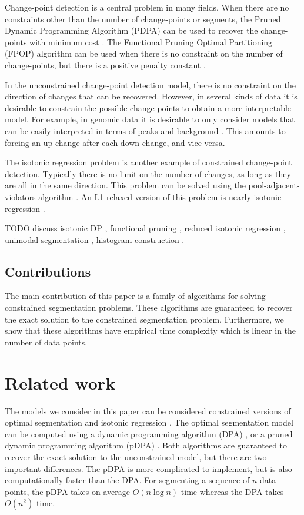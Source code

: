 \documentclass{article}
\begin{document}
Change-point detection is a central problem in many fields. When there
are no constraints other than the number of change-points or segments,
the Pruned Dynamic Programming Algorithm (PDPA) can be used to recover
the change-points with minimum cost \citep{pruned-dp}. The Functional
Pruning Optimal Partitioning (FPOP) algorithm can be used when there
is no constraint on the number of change-points, but there is a
positive penalty constant \citep{FPOP}. 

In the unconstrained change-point detection model, there is no
constraint on the direction of changes that can be recovered. However,
in several kinds of data it is desirable to constrain the possible
change-points to obtain a more interpretable model. For example, in
genomic data it is desirable to only consider models that can be
easily interpreted in terms of peaks and background
\citep{HOCKING-PeakSeg}. This amounts to forcing an up change after each down
change, and vice versa.

The isotonic regression problem is another example of constrained
change-point detection. Typically there is no limit on the number of
changes, as long as they are all in the same direction. This problem
can be solved using the pool-adjacent-violators algorithm
\citep{mair2009isotone}. An L1 relaxed version of this problem is
nearly-isotonic regression \citep{tibshirani2011nearly}.

TODO discuss isotonic DP \citep{isotonic-dp}, functional pruning
\citep{phd-johnson}, reduced isotonic regression
\citep{hardwick2014optimal}, unimodal segmentation
\citep{haiminen2008algorithms}, histogram construction
\citep{halim2009fast}.

\subsection{Contributions}

The main contribution of this paper is a family of algorithms for
solving constrained segmentation problems. These algorithms are
guaranteed to recover the exact solution to the constrained
segmentation problem. Furthermore, we show that these algorithms have
empirical time complexity which is linear in the number of data
points.

\section{Related work}
\label{sec:related}

The models we consider in this paper can be considered constrained
versions of optimal segmentation \citep{Segmentor} and isotonic
regression \citep{mair2009isotone}. The optimal segmentation model can
be computed using a dynamic programming algorithm (DPA)
\citep{bellman, segment-neighborhood, optimal-partitioning}, or a
pruned dynamic programming algorithm (pDPA) \citep{pruned-dp}. Both
algorithms are guaranteed to recover the exact solution to the
unconstrained model, but there are two important differences. The pDPA
is more complicated to implement, but is also computationally faster
than the DPA. For segmenting a sequence of $n$ data points, the pDPA
takes on average $O(n\log n)$ time whereas the DPA takes $O(n^2)$
time.
\end{document}
